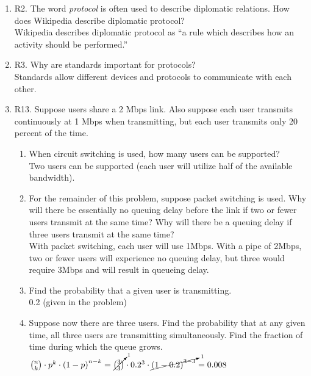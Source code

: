 \documentclass[12pt]{article}
\begin{document}
\begin{enumerate}
\item R2. The word \textit{protocol} is often used to describe diplomatic relations. How does Wikipedia describe diplomatic protocol?\\[1em]
Wikipedia describes diplomatic protocol as ``a rule which describes how an activity should be performed.''

\item R3. Why are standards important for protocols?\\[1em]
Standards allow different devices and protocols to communicate with each other.

\item R13. Suppose users share a 2 Mbps link. Also suppose each user transmits continuously at 1 Mbps when transmitting, but each user transmits only 20 percent of the time.
    \begin{enumerate}
        \item When circuit switching is used, how many users can be supported?\\[1em]
        Two users can be supported (each user will utilize half of the available bandwidth).
        \item For the remainder of this problem, suppose packet switching is used. Why will there be essentially no queuing delay before the link if two or fewer users transmit at the same time? Why will there be a queuing delay if three users transmit at the same time?\\[1em]
        With packet switching, each user will use 1Mbps. With a pipe of 2Mbps, two or fewer users will experience no queuing delay, but three would require 3Mbps and will result in queueing delay.
        \item Find the probability that a given user is transmitting.\\[1em]
        0.2 (given in the problem)
        \item Suppose now there are three users. Find the probability that at any given time, all three users are transmitting simultaneously. Find the fraction of time during which the queue grows.\\[1em]
        \(\binom{n}{k}
        \cdot p^{k}
        \cdot {\left(1-p\right)}^{n-k}
        =\cancelto{1}{\binom{3}{3}}
        \cdot 0.2^{3}
        \cdot\cancelto{1}{{\left(1-0.2\right)}^{3-3}}
        =0.008\)
    \end{enumerate}


\end{enumerate}
\end{document}
